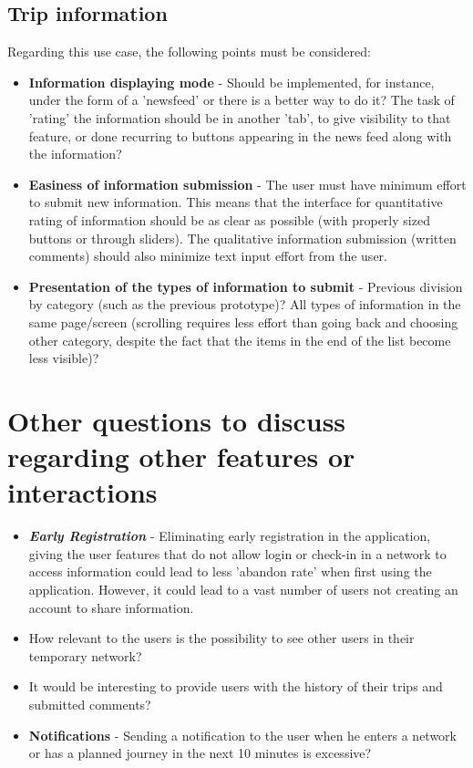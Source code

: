 \subsection{Trip information}

Regarding this use case, the following points must be considered:

\begin{itemize}
\item \textbf{Information displaying mode} - Should be implemented, for instance, under the form of a 'newsfeed' or there is a better way to do it? The task of 'rating' the information should be in another 'tab', to give visibility to that feature, or done recurring to buttons appearing in the news feed along with the information?

\item \textbf{Easiness of information submission} - The user must have minimum effort to submit new information. This means that the interface for quantitative rating of information should be as  clear as possible (with properly sized buttons or through sliders). The qualitative information submission (written comments) should also minimize text input effort from the user.

\item \textbf{Presentation of the types of information to submit} - Previous division by category (such as the previous prototype)? All types of information in the same page/screen (scrolling requires less effort than going back and choosing other category, despite the fact that the items in the end of the list become less visible)?
\end{itemize}

\section{Other questions to discuss regarding other features or interactions}

\begin{itemize}
\item \textbf{\emph{Early Registration}} - Eliminating early registration in the application, giving the user features that do not allow login or check-in in a network to access information could lead to less 'abandon rate' when first using the application.
However, it could lead to a vast number of users not creating an account to share information.

\item How relevant to the users is the possibility to see other users in their temporary network?

\item It would be interesting to provide users with the history of their trips and submitted comments?

\item \textbf{Notifications} - Sending a notification to the user when he enters a network or has a planned journey in the next 10 minutes is excessive?

\end{itemize}



